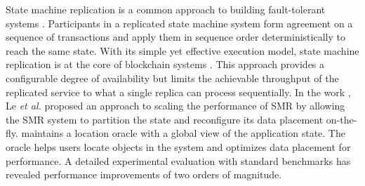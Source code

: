 State machine replication is a common approach to building fault-tolerant
systems \cite{Lam78, Sch90}. Participants in a replicated state machine system
form agreement on a sequence of transactions and apply them in sequence order
deterministically to reach the same state. With its simple yet effective
execution model, state machine replication is at the core of blockchain
systems \cite{baudet2019state, cachin2016architecture}. This approach provides a
configurable degree of availability but limits the achievable throughput of the
replicated service to what a single replica can process sequentially. In the
work \dynastar \cite{le2019dynastar}, Le \emph{et al.} proposed an approach to
scaling the performance of SMR by allowing the SMR system to partition the state and
reconfigure its data placement on-the-fly. \dynastar maintains a location oracle
with a global view of the application state. 
The oracle helps users locate objects in the system and optimizes data placement for performance.
A detailed experimental evaluation with standard benchmarks has revealed performance improvements of two orders of magnitude.
%
%

